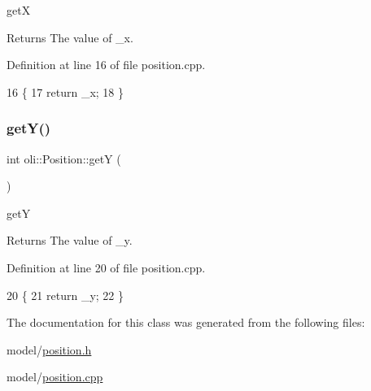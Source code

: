 getX 

\begin{DoxyReturn}{Returns}
The value of \+\_\+x. 
\end{DoxyReturn}


Definition at line 16 of file position.\+cpp.


\begin{DoxyCode}
16                   \{
17     \textcolor{keywordflow}{return} \_x;
18 \}
\end{DoxyCode}
\hypertarget{classoli_1_1_position_a7c203441f6429fcbd5bf014576219c18}{}\label{classoli_1_1_position_a7c203441f6429fcbd5bf014576219c18} 
\subsubsection{\texorpdfstring{get\+Y()}{getY()}}
{\footnotesize\ttfamily int oli\+::\+Position\+::getY (\begin{DoxyParamCaption}{ }\end{DoxyParamCaption})}



getY 

\begin{DoxyReturn}{Returns}
The value of \+\_\+y. 
\end{DoxyReturn}


Definition at line 20 of file position.\+cpp.


\begin{DoxyCode}
20                   \{
21     \textcolor{keywordflow}{return} \_y;
22 \}
\end{DoxyCode}


The documentation for this class was generated from the following files\+:\begin{DoxyCompactItemize}
\item 
model/\hyperlink{position_8h}{position.\+h}\item 
model/\hyperlink{position_8cpp}{position.\+cpp}\end{DoxyCompactItemize}
